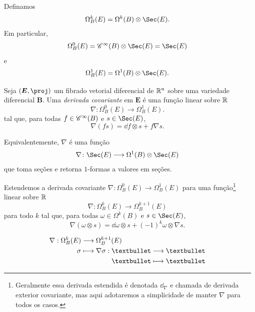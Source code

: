 Definamos
	\begin{equation*}
	\Omega^k_B(E) = \Omega^k(B) \otimes \Sec(E).
	\end{equation*}
Em particular,
	\begin{equation*}
	\Omega^0_B(E) = \cont^\infty(B) \otimes \Sec(E) = \Sec(E)
	\end{equation*}
e
	\begin{equation*}
	\Omega^1_B(E) = \Omega^1(B) \otimes \Sec(E).
	\end{equation*}

\begin{defi}
Seja $(\bm E,\proj)$ um fibrado vetorial diferencial de $\mathbb{R}^n$ sobre uma variedade diferencial $\bm B$. Uma \emph{derivada covariante} em $\bm E$ é uma função linear sobre $\mathbb{R}$
	\begin{equation*}
	\nabla\colon \Omega^0_B(E) \to \Omega^1_B(E).
	\end{equation*}
tal que, para todas $f \in \mathscr{C}^\infty(B)$ e $s \in \Sec(E)$,
	\begin{equation*}
	\nabla(fs) = \dd f \otimes s + f \nabla s.
	\end{equation*}
\end{defi}

Equivalentemente, $\nabla$ é uma função
	\begin{equation*}
	\nabla\colon \Sec(E) \to \Omega^1(B) \otimes \Sec(E)
	\end{equation*}
que toma seções e retorna $1$-formas a valores em seções.


Estendemos a derivada covariante $\nabla\colon \Omega^0_B(E) \to \Omega^1_B(E)$ para uma função\footnote{Geralmente essa derivada estendida é denotada $\dd_\nabla$ e chamada de derivada exterior covariante, mas aqui adotaremos a simplicidade de manter $\nabla$ para todos os casos.} linear sobre $\mathbb{R}$
	\begin{equation*}
	\nabla\colon \Omega^k_B(E) \to \Omega^{k+1}_B(E)
	\end{equation*}
para todo $k$ tal que, para todas $\omega \in \Omega^k(B)$ e $s \in \Sec(E)$,
	\begin{equation*}
	\nabla(\omega \otimes s) = \dd \omega \otimes s + (-1)^k \omega \otimes \nabla s.
	\end{equation*}

	\begin{align*}
	\func{\nabla}{\Omega^k_B(E)}{\Omega^{k+1}_B(E)}{\sigma}{
		\begin{aligned}[t]
		\func{\nabla \sigma}{•}{•}{•}{•}
		\end{aligned}	
	}
	\end{align*}









